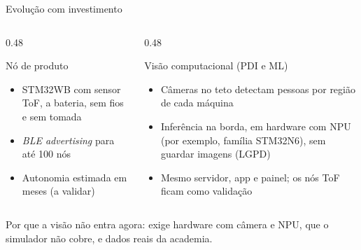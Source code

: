 \documentclass[aspectratio=169,11pt]{beamer}
\begin{document}
\begin{frame}[t]{Evolução com investimento}
  \begin{columns}[T]
    \begin{column}{0.48\textwidth}
      \begin{block}{Nó de produto}
        \footnotesize
        \begin{itemize}
          \item STM32WB com sensor ToF, a bateria, sem fios e sem tomada
          \item \emph{BLE advertising} para até 100 nós
          \item Autonomia estimada em meses (a validar)
        \end{itemize}
      \end{block}
    \end{column}
    \begin{column}{0.48\textwidth}
      \begin{block}{Visão computacional (PDI e ML)}
        \footnotesize
        \begin{itemize}
          \item Câmeras no teto detectam pessoas por região de cada máquina
          \item Inferência na borda, em hardware com NPU (por exemplo, família STM32N6), sem guardar imagens (LGPD)
          \item Mesmo servidor, app e painel; os nós ToF ficam como validação
        \end{itemize}
      \end{block}
    \end{column}
  \end{columns}
  \vspace{0.2cm}
  {\scriptsize Por que a visão não entra agora: exige hardware com câmera e NPU, que o simulador não cobre, e dados reais da academia.\par}
\end{frame}
\end{document}
